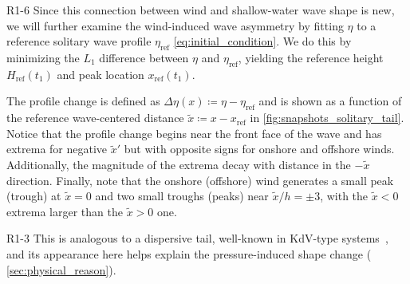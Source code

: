 \documentclass{jfm}
\begin{document}
\begin{LineLabel}{R1-6}
Since this connection between wind and shallow-water wave shape is new,
we will further examine the wind-induced wave asymmetry by fitting
$\eta$ to a reference solitary wave profile $\eta_{\text{ref}}$
\cref{eq:initial_condition}.
We do this by minimizing the $L_1$ difference between $\eta$ and
$\eta_{\text{ref}}$, yielding the reference height $H_{\text{ref}}(t_1)$
and peak location $x_{\text{ref}}(t_1)$.
\end{LineLabel}
The profile change is defined as $\Delta \eta(x) \coloneqq \eta -
\eta_{\text{ref}}$ and is shown as a function of the reference
wave-centered distance $\tilde{x} \coloneqq x - x_{\text{ref}}$ in
\cref{fig:snapshots_solitary_tail}.
Notice that the profile change begins near the front face of the wave
and has extrema for negative $\tilde{x}'$ but with opposite signs for
onshore and offshore winds.
Additionally, the magnitude of the extrema decay with distance in the
$-\tilde{x}$ direction.
Finally, note that the onshore (offshore) wind generates a small peak
(trough) at $\tilde{x} = 0$ and two small troughs (peaks) near
$\tilde{x}/h = \pm 3$, with the $\tilde{x}<0$ extrema larger than the
$\tilde{x}>0$ one.
\begin{LineLabel}{R1-3}
This is analogous to a dispersive tail, well-known in KdV-type
systems~\citep[\eg][]{hammack1974korteweg}, and its appearance here
helps explain the pressure-induced shape change (\cf{}
\cref{sec:physical_reason}).
\end{LineLabel}
\end{document}

